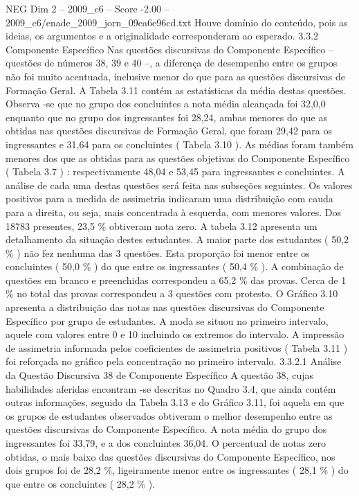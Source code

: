 \begin{textsample}{NEG Dim 2 – 2009\_c6 – Score -2.00 – 2009\_c6/enade\_2009\_jorn\_09ea6e96cd.txt}
Houve domínio do conteúdo, pois as ideias, os argumentos e a originalidade corresponderam ao esperado. 3.3.2 Componente Específico Nas questões discursivas do Componente Específico – questões de números 38, 39 e 40 –, a diferença de desempenho entre os grupos não foi muito acentuada, inclusive menor do que para as questões discursivas de Formação Geral.
A Tabela 3.11 contém as estatísticas da média destas questões.
Observa -se que no grupo dos concluintes a nota média alcançada foi 32,0,0 enquanto que no grupo dos ingressantes foi 28,24, ambas menores do que as obtidas nas questões discursivas de Formação Geral, que foram 29,42 para os ingressantes e 31,64 para os concluintes ( Tabela 3.10 ).
As médias foram também menores dos que as obtidas para as questões objetivas do Componente Específico ( Tabela 3.7 ) : respectivamente 48,04 e 53,45 para ingressantes e concluintes.
A análise de cada uma destas questões será feita nas subseções seguintes.
Os valores positivos para a medida de assimetria indicaram uma distribuição com cauda para a direita, ou seja, mais concentrada à esquerda, com menores valores.
Dos 18783 presentes, 23,5 \% obtiveram nota zero.
A tabela 3.12 apresenta um detalhamento da situação destes estudantes.
A maior parte dos estudantes ( 50,2 \% ) não fez nenhuma das 3 questões.
Esta proporção foi menor entre os concluintes ( 50,0 \% ) do que entre os ingressantes ( 50,4 \% ).
A combinação de questões em branco e preenchidas correspondeu a 65,2 \% das provas.
Cerca de 1 \% no total das provas correspondeu a 3 questões com protesto.
O Gráfico 3.10 apresenta a distribuição das notas nas questões discursivas do Componente Específico por grupo de estudantes.
A moda se situou no primeiro intervalo, aquele com valores entre 0 e 10 incluindo os extremos do intervalo.
A impressão de assimetria informada pelos coeficientes de assimetria positivos ( Tabela 3.11 ) foi reforçada no gráfico pela concentração no primeiro intervalo. 3.3.2.1 Análise da Questão Discursiva 38 de Componente Específico A questão 38, cujas habilidades aferidas encontram -se descritas no Quadro 3.4, que ainda contém outras informações, seguido da Tabela 3.13 e do Gráfico 3.11, foi aquela em que os grupos de estudantes observados obtiveram o melhor desempenho entre as questões discursivas do Componente Específico.
A nota média do grupo dos ingressantes foi 33,79, e a dos concluintes 36,04.
O percentual de notas zero obtidas, o mais baixo das questões discursivas do Componente Específico, nos dois grupos foi de 28,2 \%, ligeiramente menor entre os ingressantes ( 28,1 \% ) do que entre os concluintes ( 28,2 \% ).

\end{textsample}
